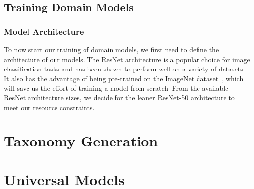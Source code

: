 \subsection{Training Domain Models}

\subsubsection{Model Architecture}

To now start our training of domain models,
we first need to define the architecture of our models.
The ResNet architecture\cite{he_deep_2015,he_identity_2016} is a popular choice for image classification tasks
and has been shown to perform well on a variety of datasets.
It also has the advantage of being pre-trained on the ImageNet dataset~\cite{deng_imagenet_2009,russakovsky_imagenet_2015},
which will save us the effort of training a model from scratch.
From the available ResNet architecture sizes,
we decide for the leaner ResNet-50 architecture to meet our resource constraints.



\section{Taxonomy Generation}



\section{Universal Models}

